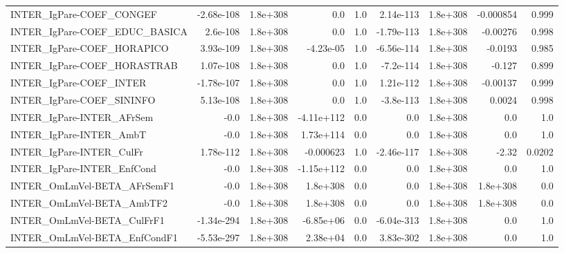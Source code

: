 \begin{tabular}{lrrrrrrrr}
INTER\_IgPare-COEF\_CONGEF              &  -2.68e-108 &     1.8e+308 &        0.0 &      1.0 &  2.14e-113 &    1.8e+308 &    -0.000854 &         0.999 \\
INTER\_IgPare-COEF\_EDUC\_BASICA         &    2.6e-108 &     1.8e+308 &        0.0 &      1.0 & -1.79e-113 &    1.8e+308 &     -0.00276 &         0.998 \\
INTER\_IgPare-COEF\_HORAPICO            &   3.93e-109 &     1.8e+308 &  -4.23e-05 &      1.0 & -6.56e-114 &    1.8e+308 &      -0.0193 &         0.985 \\
INTER\_IgPare-COEF\_HORASTRAB           &   1.07e-108 &     1.8e+308 &        0.0 &      1.0 &  -7.2e-114 &    1.8e+308 &       -0.127 &         0.899 \\
INTER\_IgPare-COEF\_INTER               &  -1.78e-107 &     1.8e+308 &        0.0 &      1.0 &  1.21e-112 &    1.8e+308 &     -0.00137 &         0.999 \\
INTER\_IgPare-COEF\_SININFO             &   5.13e-108 &     1.8e+308 &        0.0 &      1.0 &  -3.8e-113 &    1.8e+308 &       0.0024 &         0.998 \\
INTER\_IgPare-INTER\_AFrSem             &        -0.0 &     1.8e+308 & -4.11e+112 &      0.0 &        0.0 &    1.8e+308 &          0.0 &           1.0 \\
INTER\_IgPare-INTER\_AmbT               &        -0.0 &     1.8e+308 &  1.73e+114 &      0.0 &        0.0 &    1.8e+308 &          0.0 &           1.0 \\
INTER\_IgPare-INTER\_CulFr              &   1.78e-112 &     1.8e+308 &  -0.000623 &      1.0 & -2.46e-117 &    1.8e+308 &        -2.32 &        0.0202 \\
INTER\_IgPare-INTER\_EnfCond            &        -0.0 &     1.8e+308 & -1.15e+112 &      0.0 &        0.0 &    1.8e+308 &          0.0 &           1.0 \\
INTER\_OmLmVel-BETA\_AFrSemF1           &        -0.0 &     1.8e+308 &   1.8e+308 &      0.0 &        0.0 &    1.8e+308 &     1.8e+308 &           0.0 \\
INTER\_OmLmVel-BETA\_AmbTF2             &        -0.0 &     1.8e+308 &   1.8e+308 &      0.0 &        0.0 &    1.8e+308 &     1.8e+308 &           0.0 \\
INTER\_OmLmVel-BETA\_CulFrF1            &  -1.34e-294 &     1.8e+308 &  -6.85e+06 &      0.0 & -6.04e-313 &    1.8e+308 &          0.0 &           1.0 \\
INTER\_OmLmVel-BETA\_EnfCondF1          &  -5.53e-297 &     1.8e+308 &   2.38e+04 &      0.0 &  3.83e-302 &    1.8e+308 &          0.0 &           1.0 \\

\end{tabular}
